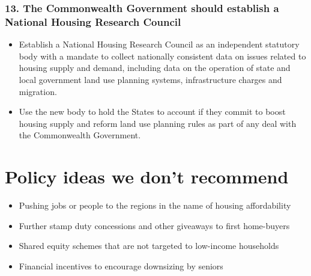 \documentclass[FrontPage]{grattan}
\begin{document}
\subsubsection{13. The Commonwealth Government should establish a National Housing Research Council}

\begin{itemize}
\item Establish a National Housing Research Council as an independent statutory body with a mandate to collect nationally consistent data on issues related to housing supply and demand, including data on the operation of state and local government land use planning systems, infrastructure charges and migration. 
\item Use the new body to hold the States to account if they commit to boost housing supply and reform land use planning rules as part of any deal with the Commonwealth Government. 
\end{itemize}

\eject
\section*{Policy ideas we don't recommend}
\begin{itemize}
\item Pushing jobs or people to the regions in the name of housing affordability
\item Further stamp duty concessions and other giveaways to first home-buyers
\item Shared equity schemes that are not targeted to low-income households
\item Financial incentives to encourage downsizing by seniors
\end{itemize}
\flushbottom


\contentspage
\listoffigures
\end{document}

